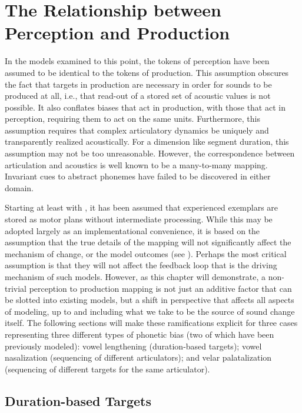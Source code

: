 \chapter{The Relationship between Perception and Production}\label{ch:Perception-Production}

In the models examined to this point, the tokens of perception have
been assumed to be identical to the tokens of production. This assumption
obscures the fact that targets in production are necessary in order
for sounds to be produced at all, i.e., that read-out of a stored
set of acoustic values is not possible. It also conflates biases that
act in production, with those that act in perception, requiring them
to act on the same units. Furthermore, this assumption requires that
complex articulatory dynamics be uniquely and transparently realized
acoustically. For a dimension like segment duration, this assumption
may not be too unreasonable. However, the correspondence between articulation
and acoustics is well known to be a many-to-many mapping. Invariant
cues to abstract phonemes have failed to be discovered in either domain. 

Starting at least with \citet{Goldinger1996}, it has been assumed
that experienced exemplars are stored as motor plans without intermediate
processing. While this may be adopted largely as an implementational
convenience, it is based on the assumption that the true details of
the mapping will not significantly affect the mechanism of change,
or the model outcomes (see \citealt{Pierrehumbert2000}). Perhaps
the most critical assumption is that they will not affect the feedback
loop that is the driving mechanism of such models. However, as this
chapter will demonstrate, a non-trivial perception to production mapping
is not just an additive factor that can be slotted into existing models,
but a shift in perspective that affects all aspects of modeling, up
to and including what we take to be the source of sound change itself.
The following sections will make these ramifications explicit for
three cases representing three different types of phonetic bias (two
of which have been previously modeled): vowel lengthening (duration-based
targets); vowel nasalization (sequencing of different articulators);
and velar palatalization (sequencing of different targets for the
same articulator). 

\section{Duration-based Targets}

